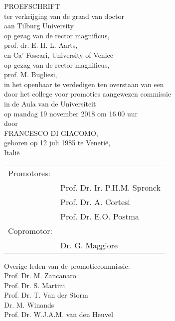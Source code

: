 \begin{titlepage}\centering
  \large \thetitle
	
	\vspace*{1.5cm}
	\large PROEFSCHRIFT\\
	\vspace*{1.5cm}
ter verkrijging van de graad van doctor\\
aan Tilburg University\\
op gezag van de rector magnificus,\\
prof. dr. E. H. L. Aarts,\\
en Ca' Foscari, University of Venice\\
op gezag van de rector magnificus,\\
prof. M. Bugliesi,\\
in het openbaar te verdedigen ten overstaan van een\\
door het college voor promoties aangewezen commissie\\
in de Aula van de Universiteit\\
op mandag 19 november 2018 om 16.00 uur\\
\vspace*{1.5cm}
door\\
\vspace*{1.5cm}
\large FRANCESCO DI GIACOMO,\\
\vspace*{1.5cm}
geboren op 12 juli 1985 te Venetië,\\
Italië

\newpage
\flushleft

\begin{tabular}{l l}
Promotores: &\\
& Prof. Dr. Ir. P.H.M. Spronck\\
& Prof. Dr. A. Cortesi\\
& Prof. Dr. E.O. Postma\\
Copromotor: &\\
& Dr. G. Maggiore
\end{tabular}

\vspace{2.5cm}

Overige leden van de promotiecommissie:\\
\hspace{1.5cm} Prof. Dr. M. Zancanaro\\
\hspace{1.5cm} Prof. Dr. S. Martini\\
\hspace{1.5cm} Prof. Dr. T. Van der Storm\\
\hspace{1.5cm} Dr. M. Winands\\
\hspace{1.5cm} Prof. Dr. W.J.A.M. van den Heuvel

\end{titlepage}

\cleardoublepage